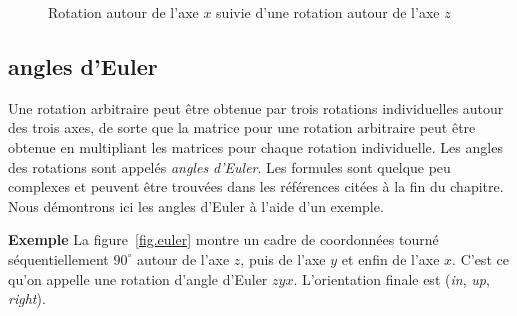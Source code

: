 \begin{figure}
\begin{center}
\hspace{2em}
\hspace{2em}
\caption{Rotation autour de l'axe $x$ suivie d'une rotation autour de l'axe $z$}
\label{fig.non-commutative2}
\end{center}
\end{figure}

\subsection{angles d'Euler}

Une rotation arbitraire peut être obtenue par trois rotations individuelles autour des trois axes, de sorte que la matrice pour une rotation arbitraire peut être obtenue en multipliant les matrices pour chaque rotation individuelle. Les angles des rotations sont appelés \emph{angles d'Euler}. Les formules sont quelque peu complexes et peuvent être trouvées dans les références citées à la fin du chapitre. Nous démontrons ici les angles d'Euler à l'aide d'un exemple.

\smallskip

\noindent\textbf{Exemple} La figure~\ref{fig.euler} montre un cadre de coordonnées tourné séquentiellement $90^\circ$ autour de l'axe $z$, puis de l'axe $y$ et enfin de l'axe $x$. C'est ce qu'on appelle une rotation d'angle d'Euler $zyx$. L'orientation finale est (\textit{in}, \textit{up}, \textit{right}).

